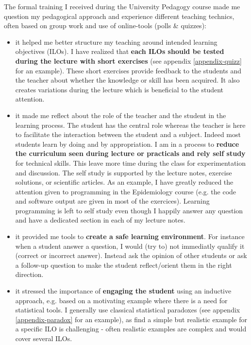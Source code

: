 \documentclass[12pt]{article}
\begin{document}
The formal training I received during the University Pedagogy course
made me question my pedagogical approach and experience different
teaching technics, often based on group work and use of online-tools
(polls \& quizzes):
\begin{itemize}
\item it helped me better structure my teaching around intended learning
objectives (ILOs). I have realized that \textbf{each ILOs should be tested
during the lecture with short exercises} (see appendix
\ref{appendix-quizz} for an example). These short exercises provide
feedback to the students and the teacher about whether the knowledge
or skill has been acquired. It also creates variations during the
lecture which is beneficial to the student attention.

\item it made me reflect about the role of the teacher and the student in
the learning process. The student has the central role whereas the
teacher is here to facilitate the interaction between the student
and a subject. Indeed most students learn by doing and by
appropriation. I am in a process to \textbf{reduce the curriculum seen
during lecture or practicals and rely self study} for technical
skills. This leave more time during the class for experimentation
and discussion. The self study is supported by the lecture notes,
exercise solutions, or scientific articles. \newline
As an example, I have greatly reduced the attention given to
programming in the Epidemiology course (e.g. the code and software
output are given in most of the exercices). Learning programming is
left to self study even though I happily answer any question and
have a dedicated section in each of my lecture notes.

\item it provided me tools to \textbf{create a safe learning environment}. For
instance when a student answer a question, I would (try to) not
immediatly qualify it (correct or incorrect answer). Instead ask the
opinion of other students or ask a follow-up question to make the
student reflect/orient them in the right direction.

\item it stressed the importance of \textbf{engaging the student} using an
inductive approach, e.g. based on a motivating example where there
is a need for statistical tools. I generally use classical
statistical paradoxes (see appendix \ref{appendix-paradox} for an
example), as find a simple but realistic example for a specific ILO
is challenging - often realistic examples are complex and would cover
several ILOs.
\end{itemize}
\end{document}
